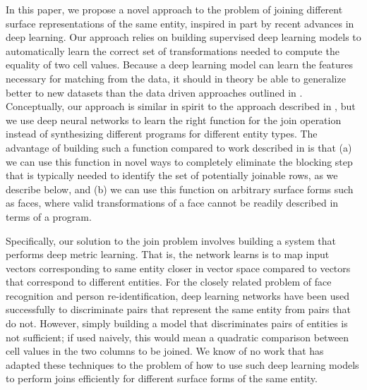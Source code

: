 In this paper, we propose a novel approach to the problem of joining different surface representations of the same entity, inspired in part by recent advances in deep learning.  Our approach relies on building supervised deep learning models to automatically learn the correct set of transformations needed to compute the equality of two cell values.  Because a deep learning model can learn the features necessary for matching from the data, it should in theory be able to generalize better to new datasets than the data driven approaches outlined in \cite{He:2015:SJS:2824032.2824036}.   Conceptually, our approach is similar in spirit to the approach described in \cite{auto-join-joining-tables-leveraging-transformations}, but we use deep neural networks to learn the right function for the join operation instead of synthesizing different programs for different entity types.  The advantage of building such a function compared to work described in \cite{auto-join-joining-tables-leveraging-transformations} is that (a) we can use this function in novel ways to completely eliminate the blocking step that is typically needed to identify the set of potentially joinable rows, as we describe below, and (b) we can use this function on arbitrary surface forms such as faces, where valid transformations of a face cannot be readily described in terms of a program.

Specifically, our solution to the join problem involves building a system that performs deep metric learning.  That is, the network learns is to map input vectors corresponding to same entity closer in vector space compared to vectors that correspond to different entities.  For the closely related problem of face recognition and person re-identification, deep learning networks have been used successfully to discriminate pairs that represent the same entity from pairs that do not.  However, simply building a model that discriminates pairs of entities is not sufficient; if used naively, this would mean a quadratic comparison between cell values in the two columns to be joined.  We know of no work that has adapted these techniques to the problem of how to use such deep learning models to perform joins efficiently for different surface forms of the same entity.  

